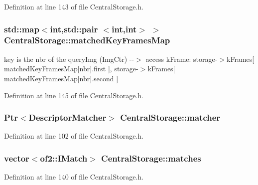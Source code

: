 \-Definition at line 143 of file \-Central\-Storage.\-h.

\hypertarget{classCentralStorage_a8382babfd80ae718d4f15ddfa5ef5017}{
\subsubsection[{matched\-Key\-Frames\-Map}]{\setlength{\rightskip}{0pt plus 5cm}std\-::map$<$int,std\-::pair $<$int,int$>$ $>$ {\bf \-Central\-Storage\-::matched\-Key\-Frames\-Map}}}\label{classCentralStorage_a8382babfd80ae718d4f15ddfa5ef5017}


key is the nbr of the query\-Img (\-Img\-Ctr) -\/-\/$>$ access k\-Frame\-: storage-\/$>$k\-Frames\mbox{[} matched\-Key\-Frames\-Map\mbox{[}nbr\mbox{]}.first \mbox{]}, storage-\/$>$k\-Frames\mbox{[} matched\-Key\-Frames\-Map\mbox{[}nbr\mbox{]}.second \mbox{]} 



\-Definition at line 145 of file \-Central\-Storage.\-h.

\hypertarget{classCentralStorage_a8ff5fb67a41c196b5677015e09ff33be}{
\subsubsection[{matcher}]{\setlength{\rightskip}{0pt plus 5cm}\-Ptr$<$\-Descriptor\-Matcher$>$ {\bf \-Central\-Storage\-::matcher}}}\label{classCentralStorage_a8ff5fb67a41c196b5677015e09ff33be}


\-Definition at line 102 of file \-Central\-Storage.\-h.

\hypertarget{classCentralStorage_af2ce7451320774bb90db744fa46493bd}{
\subsubsection[{matches}]{\setlength{\rightskip}{0pt plus 5cm}vector$<$of2\-::\-I\-Match$>$ {\bf \-Central\-Storage\-::matches}}}\label{classCentralStorage_af2ce7451320774bb90db744fa46493bd}


\-Definition at line 140 of file \-Central\-Storage.\-h.

